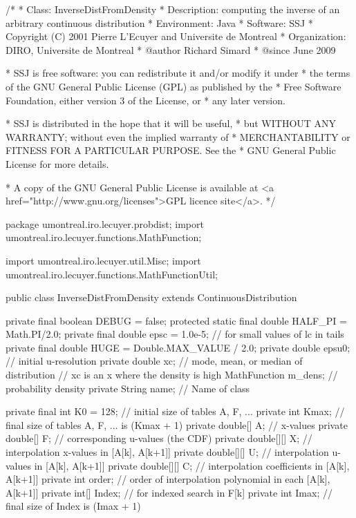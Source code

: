 \begin{code}
\begin{hide}
/*
 * Class:        InverseDistFromDensity
 * Description:  computing the inverse of an arbitrary continuous distribution
 * Environment:  Java
 * Software:     SSJ
 * Copyright (C) 2001  Pierre L'Ecuyer and Universite de Montreal
 * Organization: DIRO, Universite de Montreal
 * @author       Richard Simard
 * @since        June 2009

 * SSJ is free software: you can redistribute it and/or modify it under
 * the terms of the GNU General Public License (GPL) as published by the
 * Free Software Foundation, either version 3 of the License, or
 * any later version.

 * SSJ is distributed in the hope that it will be useful,
 * but WITHOUT ANY WARRANTY; without even the implied warranty of
 * MERCHANTABILITY or FITNESS FOR A PARTICULAR PURPOSE.  See the
 * GNU General Public License for more details.

 * A copy of the GNU General Public License is available at
   <a href="http://www.gnu.org/licenses">GPL licence site</a>.
 */
\end{hide}
package umontreal.iro.lecuyer.probdist;
   import umontreal.iro.lecuyer.functions.MathFunction;\begin{hide}
import umontreal.iro.lecuyer.util.Misc;
import umontreal.iro.lecuyer.functions.MathFunctionUtil;
\end{hide}


public class InverseDistFromDensity extends ContinuousDistribution \begin{hide} {
   private final boolean DEBUG = false;
   protected static final double HALF_PI = Math.PI/2.0;
   private final double epsc = 1.0e-5; // for small values of lc in tails
   private final double HUGE = Double.MAX_VALUE / 2.0;
   private double epsu0;      // initial u-resolution
   private double xc;         // mode, mean, or median of distribution
                              // xc is an x where the density is high
   MathFunction m_dens;       // probability density
   private String name;       // Name of class

   private final int K0 = 128;  // initial size of tables A, F, ...
   private int Kmax;          // final size of tables A, F, ... is (Kmax + 1)
   private double[] A;        // x-values
   private double[] F;        // corresponding u-values (the CDF)
   private double[][] X;      // interpolation x-values in [A[k], A[k+1]]
   private double[][] U;      // interpolation u-values in [A[k], A[k+1]]
   private double[][] C;      // interpolation coefficients in [A[k], A[k+1]]
   private int order;  // order of interpolation polynomial in each [A[k], A[k+1]]
   private int[] Index;       // for indexed search in F[k]
   private int Imax;          // final size of Index is (Imax + 1)

}
\end{hide}
\end{code}
